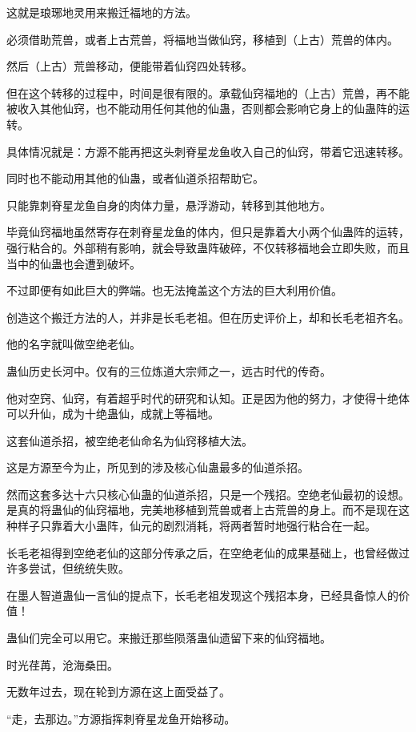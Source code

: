 \begin{this_body}
这就是琅琊地灵用来搬迁福地的方法。

必须借助荒兽，或者上古荒兽，将福地当做仙窍，移植到（上古）荒兽的体内。

然后（上古）荒兽移动，便能带着仙窍四处转移。

但在这个转移的过程中，时间是很有限的。承载仙窍福地的（上古）荒兽，再不能被收入其他仙窍，也不能动用任何其他的仙蛊，否则都会影响它身上的仙蛊阵的运转。

具体情况就是：方源不能再把这头刺脊星龙鱼收入自己的仙窍，带着它迅速转移。

同时也不能动用其他的仙蛊，或者仙道杀招帮助它。

只能靠刺脊星龙鱼自身的肉体力量，悬浮游动，转移到其他地方。

毕竟仙窍福地虽然寄存在刺脊星龙鱼的体内，但只是靠着大小两个仙蛊阵的运转，强行粘合的。外部稍有影响，就会导致蛊阵破碎，不仅转移福地会立即失败，而且当中的仙蛊也会遭到破坏。

不过即便有如此巨大的弊端。也无法掩盖这个方法的巨大利用价值。

创造这个搬迁方法的人，并非是长毛老祖。但在历史评价上，却和长毛老祖齐名。

他的名字就叫做空绝老仙。

蛊仙历史长河中。仅有的三位炼道大宗师之一，远古时代的传奇。

他对空窍、仙窍，有着超乎时代的研究和认知。正是因为他的努力，才使得十绝体可以升仙，成为十绝蛊仙，成就上等福地。

这套仙道杀招，被空绝老仙命名为仙窍移植大法。

这是方源至今为止，所见到的涉及核心仙蛊最多的仙道杀招。

然而这套多达十六只核心仙蛊的仙道杀招，只是一个残招。空绝老仙最初的设想。是真的将蛊仙的仙窍福地，完美地移植到荒兽或者上古荒兽的身上。而不是现在这种样子只靠着大小蛊阵，仙元的剧烈消耗，将两者暂时地强行粘合在一起。

长毛老祖得到空绝老仙的这部分传承之后，在空绝老仙的成果基础上，也曾经做过许多尝试，但统统失败。

在墨人智道蛊仙一言仙的提点下，长毛老祖发现这个残招本身，已经具备惊人的价值！

蛊仙们完全可以用它。来搬迁那些陨落蛊仙遗留下来的仙窍福地。

时光荏苒，沧海桑田。

无数年过去，现在轮到方源在这上面受益了。

“走，去那边。”方源指挥刺脊星龙鱼开始移动。


\end{this_body}

